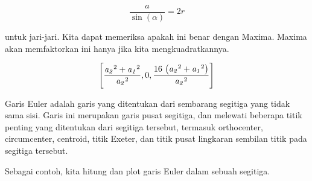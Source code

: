 \documentclass[a4paper,10pt]{article}
\begin{document}
\begin{eulernotebook}
\begin{eulercomment}
\begin{eulercomment}
\begin{eulercomment}
\begin{eulercomment}
\begin{eulercomment}
\begin{eulercomment}
\begin{eulercomment}
\begin{eulercomment}
\begin{eulercomment}
\begin{eulercomment}
\begin{eulercomment}
\begin{eulercomment}
\begin{eulercomment}
\begin{eulercomment}
\begin{eulercomment}
\begin{eulercomment}
\begin{eulercomment}
\begin{eulercomment}
\begin{eulercomment}
\end{eulercomment}
\begin{eulerformula}
\[
\frac{a}{\sin(\alpha)}=2r
\]
\end{eulerformula}
\begin{eulercomment}
untuk jari-jari. Kita dapat memeriksa apakah ini benar dengan Maxima.
Maxima akan memfaktorkan ini hanya jika kita mengkuadratkannya.
\end{eulercomment}
\begin{eulerformula}
\[
\left[ \frac{{\it a_2}^2+{\it a_1}^2}{{\it a_2}^2} , 0 , \frac{16\,  \left({\it a_2}^2+{\it a_1}^2\right)}{{\it a_2}^2} \right] 
\]
\end{eulerformula}
\begin{eulercomment}
Garis Euler adalah garis yang ditentukan dari sembarang segitiga yang
tidak sama sisi. Garis ini merupakan garis pusat segitiga, dan
melewati beberapa titik penting yang ditentukan dari segitiga
tersebut, termasuk orthocenter, circumcenter, centroid, titik Exeter,
dan titik pusat lingkaran sembilan titik pada segitiga tersebut.

Sebagai contoh, kita hitung dan plot garis Euler dalam sebuah
segitiga.


\end{eulercomment}
\end{eulercomment}
\end{eulercomment}
\end{eulercomment}
\end{eulercomment}
\end{eulercomment}
\end{eulercomment}
\end{eulercomment}
\end{eulercomment}
\end{eulercomment}
\end{eulercomment}
\end{eulercomment}
\end{eulercomment}
\end{eulercomment}
\end{eulercomment}
\end{eulercomment}
\end{eulercomment}
\end{eulercomment}
\end{eulercomment}
\end{eulernotebook}
\end{document}
